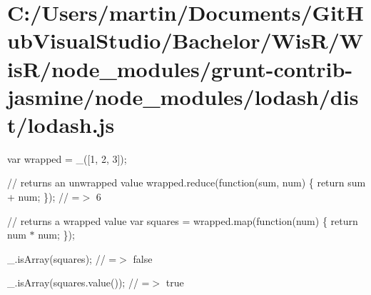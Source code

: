 \hypertarget{_c_1_2_users_2martin_2_documents_2_git_hub_visual_studio_2_bachelor_2_wis_r_2_wis_r_2node_module55788165fa73e07bbb561ea13c73be7a}{}\section{C\+:/\+Users/martin/\+Documents/\+Git\+Hub\+Visual\+Studio/\+Bachelor/\+Wis\+R/\+Wis\+R/node\+\_\+modules/grunt-\/contrib-\/jasmine/node\+\_\+modules/lodash/dist/lodash.\+js}
var wrapped = \+\_\+(\mbox{[}1, 2, 3\mbox{]});

// returns an unwrapped value wrapped.\+reduce(function(sum, num) \{ return sum + num; \}); // =$>$ 6

// returns a wrapped value var squares = wrapped.\+map(function(num) \{ return num $\ast$ num; \});

\+\_\+.\+is\+Array(squares); // =$>$ false

\+\_\+.\+is\+Array(squares.\+value()); // =$>$ true


